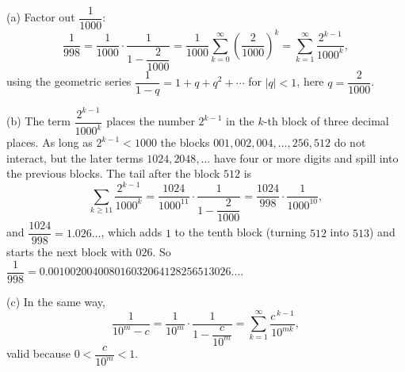 (a) Factor out $\dfrac{1}{1000}$:
\[
\dfrac{1}{998}=\dfrac{1}{1000}\cdot\dfrac{1}{1-\dfrac{2}{1000}}=\dfrac{1}{1000}\sum_{k=0}^{\infty}\left(\dfrac{2}{1000}\right)^k=\sum_{k=1}^{\infty}\dfrac{2^{k-1}}{1000^k},
\]
using the geometric series $\dfrac{1}{1-q}=1+q+q^2+\cdots$ for $|q|<1$, here $q=\dfrac{2}{1000}$.

(b) The term $\dfrac{2^{k-1}}{1000^k}$ places the number $2^{k-1}$ in the $k$-th block of three decimal places. As long as $2^{k-1}<1000$ the blocks $001,002,004,\dots,256,512$ do not interact, but the later terms $1024,2048,\dots$ have four or more digits and spill into the previous blocks. The tail after the block $512$ is
\[
\sum_{k\ge11}\dfrac{2^{k-1}}{1000^k}=\dfrac{1024}{1000^{11}}\cdot\dfrac{1}{1-\dfrac{2}{1000}}=\dfrac{1024}{998}\cdot\dfrac{1}{1000^{10}},
\]
and $\dfrac{1024}{998}=1.026\ldots$, which adds $1$ to the tenth block (turning $512$ into $513$) and starts the next block with $026$. So $\dfrac{1}{998}=0.001002004008016032064128256513026\ldots$.

(c) In the same way,
\[
\dfrac{1}{10^m-c}=\dfrac{1}{10^m}\cdot\dfrac{1}{1-\dfrac{c}{10^m}}=\sum_{k=1}^{\infty}\dfrac{c^{\,k-1}}{10^{mk}},
\]
valid because $0<\dfrac{c}{10^m}<1$.
